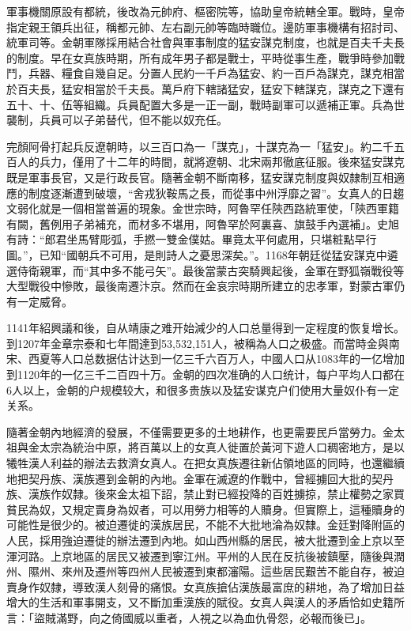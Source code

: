 軍事機關原設有都統，後改為元帥府、樞密院等，協助皇帝統轄全軍。戰時，皇帝指定親王領兵出征，稱都元帥、左右副元帥等臨時職位。邊防軍事機構有招討司、統軍司等。金朝軍隊採用結合社會與軍事制度的猛安謀克制度，也就是百夫千夫長的制度。早在女真族時期，所有成年男子都是戰士，平時從事生產，戰爭時參加戰鬥，兵器、糧食自幾自足。分置人民約一千戶為猛安、約一百戶為謀克，謀克相當於百夫長，猛安相當於千夫長。萬戶府下轄諸猛安，猛安下轄謀克，謀克之下還有五十、十、伍等組織。兵員配置大多是一正一副，戰時副軍可以遞補正軍。兵為世襲制，兵員可以子弟替代，但不能以奴充任。

完顏阿骨打起兵反遼朝時，以三百口為一「謀克」，十謀克為一「猛安」。約二千五百人的兵力，僅用了十二年的時間，就將遼朝、北宋兩邦徹底征服。後來猛安謀克既是軍事長官，又是行政長官。隨著金朝不斷南移，猛安謀克制度與奴隸制互相適應的制度逐漸遭到破壞，“舍戎狄鞍馬之長，而從事中州浮靡之習”。女真人的日趨文弱化就是一個相當普遍的現象。金世宗時，阿魯罕任陝西路統軍使，「陝西軍籍有闕，舊例用子弟補充，而材多不堪用，阿魯罕於阿裏喜、旗鼓手內選補」。史旭有詩：“郎君坐馬臂彫弧，手撚一雙金僕姑。畢竟太平何處用，只堪粧點早行圖。”，已知“國朝兵不可用，是則詩人之憂思深矣。”。1168年朝廷從猛安謀克中遴選侍衛親軍，而“其中多不能弓矢”。最後當蒙古突騎興起後，金軍在野狐嶺戰役等大型戰役中慘敗，最後南遷汴京。然而在金哀宗時期所建立的忠孝軍，對蒙古軍仍有一定威脅。

1141年紹興議和後，自从靖康之难开始減少的人口总量得到一定程度的恢复增长。到1207年金章宗泰和七年間達到53,532,151人，被稱為人口之极盛。而當時金與南宋、西夏等人口总数据估计达到一亿三千六百万人，中國人口从1083年的一亿增加到1120年的一亿三千二百四十万。金朝的四次准确的人口统计，每户平均人口都在6人以上，金朝的户规模较大，和很多贵族以及猛安谋克户们使用大量奴仆有一定关系。

隨著金朝內地經濟的發展，不僅需要更多的土地耕作，也更需要民戶當勞力。金太祖與金太宗為統治中原，將百萬以上的女真人徙置於黃河下遊人口稠密地方，是以犧牲漢人利益的辦法去救濟女真人。在把女真族遷往新佔領地區的同時，也還繼續地把契丹族、漢族遷到金朝的內地。金軍在滅遼的作戰中，曾經擄回大批的契丹族、漢族作奴隸。後來金太祖下詔，禁止對已經投降的百姓擄掠，禁止權勢之家買貧民為奴，又規定賣身為奴者，可以用勞力相等的人贖身。但實際上，這種贖身的可能性是很少的。被迫遷徙的漢族居民，不能不大批地淪為奴隸。金廷對降附區的人民，採用強迫遷徙的辦法遷到內地。如山西州縣的居民，被大批遷到金上京以至渾河路。上京地區的居民又被遷到寧江州。平州的人民在反抗後被鎮壓，隨後與潤州、隰州、來州及遷州等四州人民被遷到東都瀋陽。這些居民艱苦不能自存，被迫賣身作奴隸，導致漢人刻骨的痛恨。女真族搶佔漢族最富庶的耕地，為了增加日益增大的生活和軍事開支，又不斷加重漢族的賦役。女真人與漢人的矛盾恰如史籍所言：「盜賊滿野，向之倚國威以重者，人視之以為血仇骨怨，必報而後已」。

